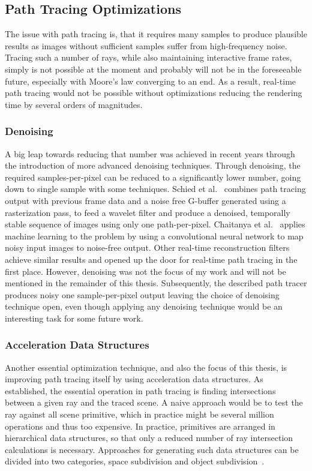 \subsection{Path Tracing Optimizations}
The issue with path tracing is, that it requires many samples to produce plausible results as images without sufficient samples suffer from high-frequency noise. Tracing such a number of rays, while also maintaining interactive frame rates, simply is not possible at the moment and probably will not be in the foreseeable future, especially with Moore's law converging to an end. As a result, real-time path tracing would not be possible without optimizations reducing the rendering time by several orders of magnitudes. 
\subsubsection{Denoising}
A big leap towards reducing that number was achieved in recent years through the introduction of more advanced denoising techniques. Through denoising, the required samples-per-pixel can be reduced to a significantly lower number, going down to single sample with some techniques. Schied et al.~\cite{schied_spatiotemporal_2017} combines path tracing output with previous frame data and a noise free G-buffer generated using a rasterization pass, to feed a wavelet filter and produce a denoised, temporally stable sequence of images using only one path-per-pixel. Chaitanya et al.~\cite{chaitanya_interactive_2017} applies machine learning to the problem by using a convolutional neural network to map noisy input images to noise-free output. Other real-time reconstruction filters\cite{mara17towards,koskela2019bmfr} achieve similar results and opened up the door for real-time path tracing in the first place. However, denoising was not the focus of my work and will not be mentioned in the remainder of this thesis. Subsequently, the described path tracer produces noisy one sample-per-pixel output leaving the choice of denoising technique open, even though applying any denoising technique would be an interesting task for some future work.
\subsubsection{Acceleration Data Structures}
Another essential optimization technique, and also the focus of this thesis, is improving path tracing itself by using acceleration data structures. As established, the essential operation in path tracing is finding intersections between a given ray and the traced scene. A naive approach would be to test the ray against all scene primitive, which in practice might be several million operations and thus too expensive. In practice, primitives are arranged in hierarchical data structures, so that only a reduced number of ray intersection calculations is necessary. Approaches for generating such data structures can be divided into two categories, space subdivision and object subdivision~\cite{macDonald1988space}.

